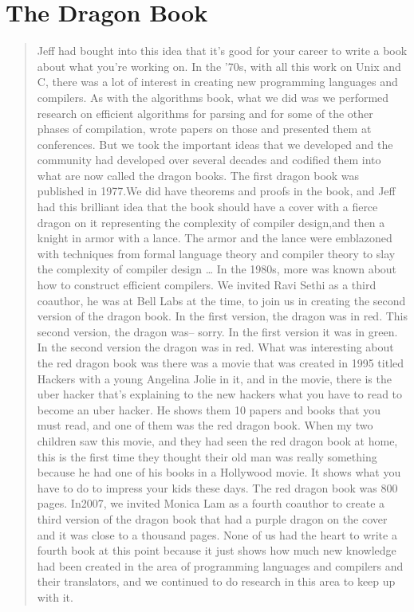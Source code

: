
\section{The Dragon Book}
\begin{quotation}
    Jeff had bought into this idea that it's good for your career to write a 
book about what you're working on. In the '70s, with all this work on Unix and 
C, there was a lot of interest in creating new programming languages and 
compilers. As with the algorithms book, what we did was we performed research 
on efficient algorithms for parsing and for some of the other phases of 
compilation, wrote papers on those  and presented them at conferences. But we 
took the important ideas that we developed and the community had developed over 
several decades and codified them into what are now called the dragon books. The 
first dragon book was published in 1977.We did have theorems and proofs in the 
book, and Jeff had this brilliant idea that the book should have a cover with a 
fierce dragon on it representing the complexity of compiler design,and then a 
knight in armor with a lance. The armor and the lance were emblazoned with 
techniques from formal language theory and compiler theory to slay the 
complexity of compiler design
\dots
In the 1980s, more was known about how to construct efficient compilers. We 
invited Ravi Sethi as a third coauthor, he was at Bell Labs at the time, to join 
us in creating the second version of the dragon book. In the first version, the 
dragon was in red. This second version, the dragon was-- sorry. In the first 
version it was in green. In the second version the dragon was in red. What was 
interesting about the red dragon book was there was a movie that was created in 
1995 titled Hackers with a young Angelina Jolie in it, and in the movie, there 
is the uber hacker that's explaining to the new hackers what you have to read to 
become an uber hacker. He shows them 10 papers and books that you must read, and 
one of them was the red dragon book. When my two children saw this movie, and 
they had seen the red dragon book at home, this is the first time they thought 
their old man was really something because he had one of his books in a 
Hollywood movie. It shows what you have to do to impress your kids these days. 
The red dragon book was 800 pages. In2007, we invited Monica Lam as a fourth 
coauthor to create a third version of the dragon book that had a purple dragon 
on the cover and it was close to a thousand pages. None of us had the heart to 
write a fourth book at this point because it just shows how much new knowledge 
had been created in the area of programming languages and compilers and their 
translators, and we continued to do research in this area to keep up with it.
\cite{aho_oral_history_2022}
\end{quotation}
